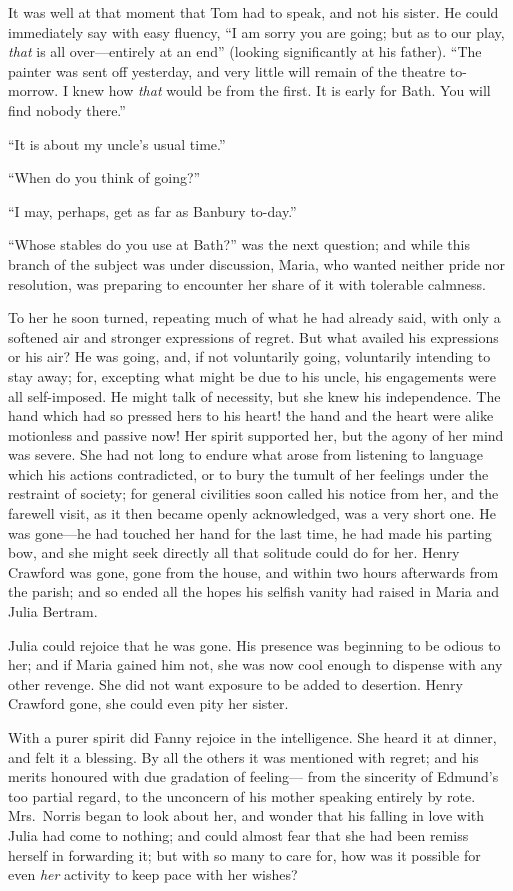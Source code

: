 \documentclass{article}
\begin{document}
It was well at that moment that Tom had to speak, and not
his sister.  He could immediately say with easy fluency,
``I am sorry you are going; but as to our play, \emph{that} is
all over---entirely at an end'' (looking significantly
at his father). ``The painter was sent off yesterday,
and very little will remain of the theatre to-morrow. I knew
how \emph{that} would be from the first.  It is early for Bath.
You will find nobody there.''

``It is about my uncle's usual time.''

``When do you think of going?''

``I may, perhaps, get as far as Banbury to-day.''

``Whose stables do you use at Bath?'' was the next question;
and while this branch of the subject was under discussion,
Maria, who wanted neither pride nor resolution, was preparing
to encounter her share of it with tolerable calmness.

To her he soon turned, repeating much of what he had
already said, with only a softened air and stronger
expressions of regret.  But what availed his expressions
or his air?  He was going, and, if not voluntarily going,
voluntarily intending to stay away; for, excepting what might
be due to his uncle, his engagements were all self-imposed.
He might talk of necessity, but she knew his independence.
The hand which had so pressed hers to his heart! the hand
and the heart were alike motionless and passive now!
Her spirit supported her, but the agony of her mind was severe.
She had not long to endure what arose from listening
to language which his actions contradicted, or to bury
the tumult of her feelings under the restraint of society;
for general civilities soon called his notice from her,
and the farewell visit, as it then became openly acknowledged,
was a very short one.  He was gone---he had touched her
hand for the last time, he had made his parting bow,
and she might seek directly all that solitude could do
for her.  Henry Crawford was gone, gone from the house,
and within two hours afterwards from the parish;
and so ended all the hopes his selfish vanity had raised
in Maria and Julia Bertram.

Julia could rejoice that he was gone.  His presence was
beginning to be odious to her; and if Maria gained him not,
she was now cool enough to dispense with any other revenge.
She did not want exposure to be added to desertion.
Henry Crawford gone, she could even pity her sister.

With a purer spirit did Fanny rejoice in the intelligence.
She heard it at dinner, and felt it a blessing.
By all the others it was mentioned with regret;
and his merits honoured with due gradation of feeling---%
from the sincerity of Edmund's too partial regard,
to the unconcern of his mother speaking entirely by rote.
Mrs.\ Norris began to look about her, and wonder that
his falling in love with Julia had come to nothing;
and could almost fear that she had been remiss herself
in forwarding it; but with so many to care for, how was
it possible for even \emph{her} activity to keep pace with
her wishes?
\end{document}
